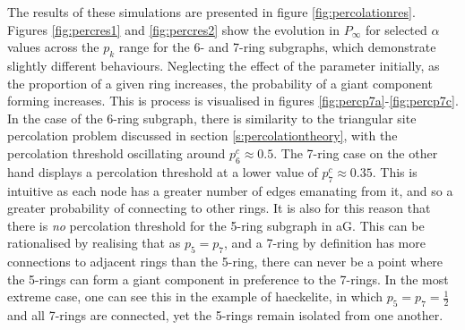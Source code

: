 The results of these simulations are presented in figure \ref{fig:percolationres}.
Figures \ref{fig:percres1} and \ref{fig:percres2} show the evolution in $P_\infty$ for selected $\alpha$ values across the $p_k$ range for the 6\-- and 7\--ring subgraphs, which demonstrate slightly different behaviours.
Neglecting the effect of the \aw{} parameter initially, as the proportion of a given ring increases, the probability of a giant component forming increases.
This is process is visualised in figures \ref{fig:percp7a}\--\ref{fig:percp7c}.
In the case of the 6\--ring subgraph, there is similarity to the triangular site percolation problem discussed in section \ref{s:percolationtheory}, with the percolation threshold oscillating around $p_6^c\approx0.5$.
The 7\--ring case on the other hand displays a percolation threshold at a lower value of $p_7^c\approx0.35$.
This is intuitive as each node has a greater number of edges emanating from it, and so a greater probability of connecting to other rings.
It is also for this reason that there is \textit{no} percolation threshold for the 5\--ring subgraph in aG.
This can be rationalised by realising that as $p_5=p_7$, and a 7\--ring by definition has more connections to adjacent rings than the 5\--ring, there can never be a point where the 5\--rings can form a giant component in preference to the 7\--rings.
In the most extreme case, one can see this in the example of haeckelite, in which $p_5=p_7=\frac{1}{2}$ and all 7\--rings are connected, yet the 5\--rings remain isolated from one another.

